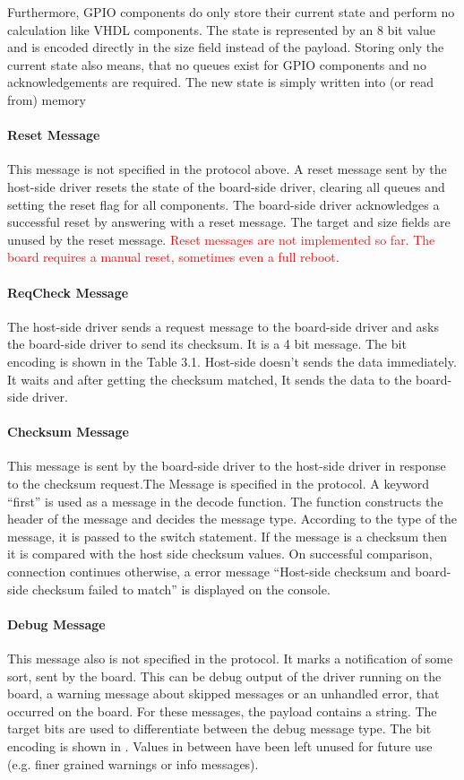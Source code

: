 \documentclass{report}
\begin{document}
Furthermore, GPIO components do only store their current state and perform no calculation like VHDL components. The state is represented by an 8 bit value and is encoded directly in the size field instead of the payload. Storing only the current state also means, that no queues exist for GPIO components and no acknowledgements are required. The new state is simply written into (or read from) memory

\paragraph{Reset Message}
This message is not specified in the protocol above. A reset message sent by the host-side driver resets the state of the board-side driver, clearing all queues and setting the reset flag for all components. The board-side driver acknowledges a successful reset by answering with a reset message. 
The target and size fields are unused by the reset message. \textcolor{red}{Reset messages are not implemented so far. The board requires a manual reset, sometimes even a full reboot.}

\paragraph{ReqCheck Message}
The host-side driver sends a request message to the board-side driver and asks the board-side driver to send its checksum. It is a 4 bit message. The bit encoding is shown in the Table 3.1. Host-side doesn't sends the data immediately. It waits and after getting the checksum matched, It sends the data to the board-side driver.

\paragraph{Checksum Message}
This message is sent by the board-side driver to the host-side driver in response to the checksum request.The Message is specified in the protocol. A keyword “first” is used as a message in the decode function. The function constructs the header of the message and decides the message type. According to the type of the message, it is passed to the switch statement. If the message is a checksum then it is compared with the host side checksum values. On successful comparison, connection continues otherwise, a error message “Host-side checksum and board-side checksum failed to match” is displayed on the console.

\paragraph{Debug Message}
This message also is not specified in the protocol. It marks a notification of some sort, sent by the board. This can be debug output of the driver running on the board, a warning message about skipped messages or an unhandled error, that occurred on the board. For these messages, the payload contains a string.
The target bits are used to differentiate between the debug message type. The bit encoding is shown in . Values in between have been left unused for future use (e.g. finer grained warnings or info messages).
\end{document}
